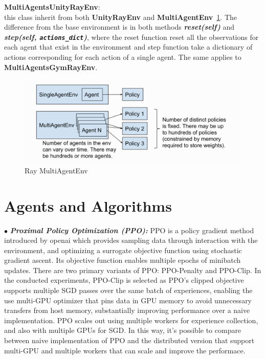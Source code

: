 \textbf{MultiAgentsUnityRayEnv}:\\
this class inherit from both \colorbox{gray!20}{\textbf{UnityRayEnv}} and \colorbox{gray!20}{\textbf{MultiAgentEnv}}~\ref{fig:ray_multiagentenv}. The difference from the base environment is in both methods \textit{\textbf{\colorbox{gray!20}{reset(self)}}} and \textit{\textbf{\colorbox{gray!20}{step(self, \texttt{actions\_dict})}}}, where the reset function reset all the observations for each agent that exist in the environment and step function take a dictionary of actions corresponding for each action of a single agent. The same applies to \textbf{MultiAgentsGymRayEnv}.

\begin{figure}[!htb]
		\centering
		\includegraphics[width=\linewidth]{figures/architecture/ray_multiagentenv.png}
		\caption{Ray MultiAgentEnv}
		\label{fig:ray_multiagentenv}
\end{figure}

\section{Agents and Algorithms}

$\bullet$ \textit{\textbf{Proximal Policy Optimization (PPO):}} PPO is a policy gradient method introduced by openai which provides sampling data through interaction with the environment, and optimizing a surrogate objective function using stochastic gradient ascent. Its objective function enables multiple epochs of minibatch updates. There are two primary variants of PPO: PPO-Penalty and PPO-Clip. In the conducted experiments, PPO-Clip is selected as PPO’s clipped objective supports multiple SGD passes over the same batch of experiences, enabling the use multi-GPU optimizer that pins data in GPU memory to avoid unnecessary transfers from host memory, substantially improving performance over a naive implementation. PPO scales out using multiple workers for experience collection, and also with multiple GPUs for SGD. In this way, it's possible to compare between naive implementation of PPO and the distributed version that support multi-GPU and multiple workers that can scale and improve the performace.

